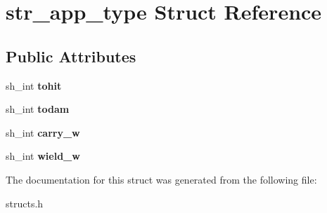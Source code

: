 \hypertarget{structstr__app__type}{}\section{str\+\_\+app\+\_\+type Struct Reference}
\label{structstr__app__type}
\subsection*{Public Attributes}
\begin{DoxyCompactItemize}
\item 
\mbox{\label{structstr__app__type_a7ab2807df2618eba524e9d9da0bd341d}} 
sh\+\_\+int {\bfseries tohit}
\item 
\mbox{\label{structstr__app__type_a2faa205495e5fd9a35ec6a5b248e5465}} 
sh\+\_\+int {\bfseries todam}
\item 
\mbox{\label{structstr__app__type_aeb12289a1fa6dbdf69e0d89d5e994511}} 
sh\+\_\+int {\bfseries carry\+\_\+w}
\item 
\mbox{\label{structstr__app__type_a0d10eccb751fa94ad9c8ecd8762c3bb1}} 
sh\+\_\+int {\bfseries wield\+\_\+w}
\end{DoxyCompactItemize}


The documentation for this struct was generated from the following file\+:\begin{DoxyCompactItemize}
\item 
structs.\+h\end{DoxyCompactItemize}
